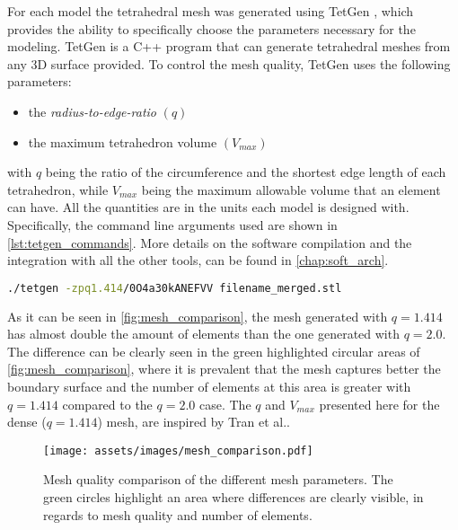For each model the tetrahedral mesh was generated using TetGen \cite{tetgen}, which provides the ability to specifically choose the parameters necessary for the modeling. TetGen \cite{tetgen} is a C++ program that can generate tetrahedral meshes from any 3D surface provided. To control the mesh quality, TetGen \cite{tetgen} uses the following parameters:
\begin{itemize}
	\item the \textit{radius-to-edge-ratio} $(q)$
	\item the maximum tetrahedron volume $(V_{max})$
\end{itemize}
with $q$ being the ratio of the circumference and the shortest edge length of each tetrahedron, while $V_{max}$ being the maximum allowable volume that an element can have. All the quantities are in the units each model is designed with. Specifically, the command line arguments used are shown in \autoref{lst:tetgen_commands}. More details on the software compilation and the integration with all the other tools, can be found in \autoref{chap:soft_arch}.
\begin{lstlisting}[language=bash,caption={Command to run TetGen},captionpos=b, label=lst:tetgen_commands]
	./tetgen -zpq1.414/0O4a30kANEFVV filename_merged.stl
\end{lstlisting}

As it can be seen in \autoref{fig:mesh_comparison}, the mesh generated with $q = 1.414$ has almost double the amount of elements than the one generated with $q = 2.0$. The difference can be clearly seen in the green highlighted circular areas of \autoref{fig:mesh_comparison}, where it is prevalent that the mesh captures better the boundary surface and the number of elements at this area is greater with $q = 1.414$ compared to the $q = 2.0$ case. The $q$ and $V_{max}$ presented here for the dense ($q=1.414$) mesh, are inspired by Tran et al.\cite{Tran2020}.

\begin{figure}[H]
    \centering
    \texttt{[image: assets/images/mesh\_comparison.pdf]}
    \caption[Mesh quality comparison for the different $q$ parameters.]{Mesh quality comparison of the different mesh parameters. The green circles highlight an area where differences are clearly visible, in regards to mesh quality and number of elements.}
    \label{fig:mesh_comparison}
\end{figure}

